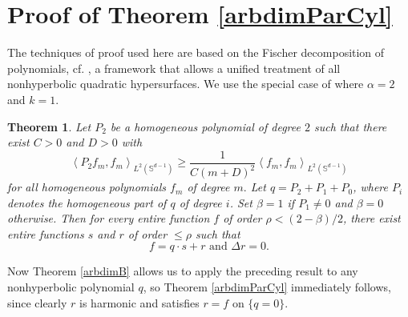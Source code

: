 \documentclass[12pt]{amsart}
\newtheorem{theorem}{Theorem}
\begin{document}
\section{Proof of Theorem \ref{arbdimParCyl}}

The
techniques of proof used here are based on the Fischer decomposition of polynomials, cf. \cite{RendAl22},  a framework that allows a unified treatment of all nonhyperbolic quadratic hypersurfaces.
We use the special case of \cite[Theorem 1]{RendAl22} where  $\alpha = 2$ and $k = 1$. 

\begin{theorem}
\label{ThmMain1} Let $P_{2}$ be a homogeneous polynomial of degree $2$
such that there exist $C>0$ and $D>0$ with 
\begin{equation}
\left\langle P_{2}f_{m},f_{m}\right\rangle _{L^{2}(\mathbb{S}^{d-1})}\geq 
\frac{1}{C\left( m+D\right) ^{2}}\left\langle f_{m},f_{m}\right\rangle
_{L^2(\mathbb{S}^{d-1})}  \label{eqmainassumption}
\end{equation}
for all homogeneous polynomials $f_{m}$ of degree $m.$  Let 
$q = P_2 + P_1 + P_0$, where $P_i$ denotes the homogeneous part of $q$ of degree $i$. Set 
$\beta =1$ if $P_1 \ne 0$ and $\beta = 0$ otherwise. 
 Then for every entire function $f$ of order $\rho <\left(
2-\beta \right) /2 $, there exist entire functions $s$ and $r$ of
order $\leq \rho $ such that 
\begin{equation*}
f= q \cdot s+r\text{ and }\Delta r=0.
\end{equation*}
\end{theorem}

Now Theorem \ref{arbdimB} allows us to apply the preceding result to any nonhyperbolic polynomial $q$, so
 Theorem \ref{arbdimParCyl} immediately follows, since clearly $r$ is harmonic and satisfies
 $r = f$ on $\{q = 0\}$.
 




\end{document}
